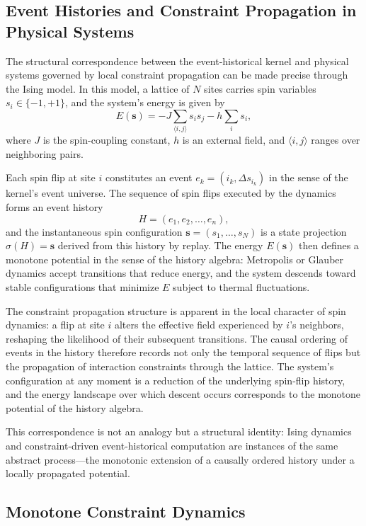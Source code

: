 \documentclass[12pt]{article}
\begin{document}
\subsection{Event Histories and Constraint Propagation in Physical Systems}

The structural correspondence between the event-historical kernel and physical systems governed by local constraint propagation can be made precise through the Ising model. In this model, a lattice of $N$ sites carries spin variables $s_i \in \{-1, +1\}$, and the system's energy is given by
\[
E(\mathbf{s}) = -J \sum_{\langle i,j \rangle} s_i s_j - h \sum_i s_i,
\]
where $J$ is the spin-coupling constant, $h$ is an external field, and $\langle i, j \rangle$ ranges over neighboring pairs.

Each spin flip at site $i$ constitutes an event $e_k = (i_k, \Delta s_{i_k})$ in the sense of the kernel's event universe. The sequence of spin flips executed by the dynamics forms an event history
\[
H = (e_1, e_2, \ldots, e_n),
\]
and the instantaneous spin configuration $\mathbf{s} = (s_1, \ldots, s_N)$ is a state projection $\sigma(H) = \mathbf{s}$ derived from this history by replay. The energy $E(\mathbf{s})$ then defines a monotone potential in the sense of the history algebra: Metropolis or Glauber dynamics accept transitions that reduce energy, and the system descends toward stable configurations that minimize $E$ subject to thermal fluctuations.

The constraint propagation structure is apparent in the local character of spin dynamics: a flip at site $i$ alters the effective field experienced by $i$'s neighbors, reshaping the likelihood of their subsequent transitions. The causal ordering of events in the history therefore records not only the temporal sequence of flips but the propagation of interaction constraints through the lattice. The system's configuration at any moment is a reduction of the underlying spin-flip history, and the energy landscape over which descent occurs corresponds to the monotone potential of the history algebra.

This correspondence is not an analogy but a structural identity: Ising dynamics and constraint-driven event-historical computation are instances of the same abstract process---the monotonic extension of a causally ordered history under a locally propagated potential.

\subsection{Monotone Constraint Dynamics}
\end{document}
